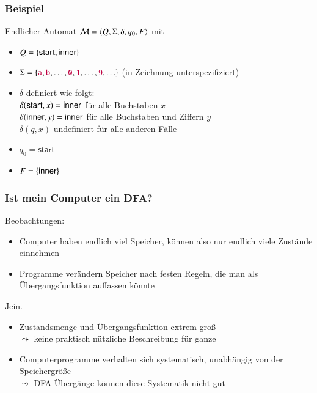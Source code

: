 \documentclass[aspectratio=1610,onlymath]{beamer}
\begin{document}
\begin{frame}\frametitle{Beispiel}


Endlicher Automat $\mathcal{M}=\langle{Q,\Sigma,\delta,q_0,F}\rangle$ mit 
\begin{itemize}
\item $Q=\{ \textsf{start},\allowbreak\textsf{inner}\}$
\item $\Sigma=\{\mathtt{\textcolor{purple}{a}},\mathtt{\textcolor{purple}{b}},\ldots,\mathtt{\textcolor{purple}{0}},\mathtt{\textcolor{purple}{1}},\ldots,\mathtt{\textcolor{purple}{9}},\ldots\}$ (in Zeichnung unterspezifiziert)
\item $\delta$ definiert wie folgt:\\
	$\delta(\textsf{start},x)=\textsf{inner}$ für alle Buchstaben $x$\\
	$\delta(\textsf{inner},y)=\textsf{inner}$ für alle Buchstaben und Ziffern $y$\\
	$\delta(q,x)$ undefiniert für alle anderen Fälle
\item $q_0= \textsf{start}$
\item $F=\{\textsf{inner}\}$
\end{itemize}


\end{frame}

\begin{frame}\frametitle{Ist mein Computer ein DFA?}

Beobachtungen:
\begin{itemize}
\item Computer haben endlich viel Speicher, können also nur endlich viele Zustände einnehmen
\item Programme verändern Speicher nach festen Regeln, die man als Übergangsfunktion auffassen könnte
\end{itemize}

\pause

\bigskip
Jein.
\begin{itemize}
\item Zustandsmenge und Übergangsfunktion extrem groß\\
$\leadsto$ keine praktisch nützliche Beschreibung für ganze 
\item Computerprogramme verhalten sich systematisch, unabhängig von der Speichergröße\\
$\leadsto$ DFA-Übergänge können diese Systematik nicht gut 
\end{itemize}

\end{frame}
\end{document}
